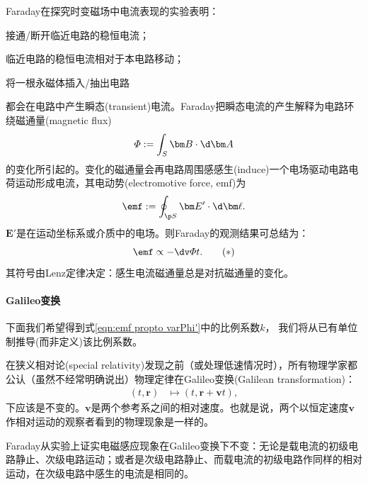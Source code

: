 Faraday在探究时变磁场中电流表现的实验表明：
\begin{compactenum}
    \item 接通/断开临近电路的稳恒电流；
    \item 临近电路的稳恒电流相对于本电路移动；
    \item 将一根永磁体插入/抽出电路
\end{compactenum}
都会在电路中产生瞬态(transient)电流。Faraday把瞬态电流的产生解释为电路环绕磁通量(magnetic flux)%
\begin{equation}
    \varPhi:=\int_S\bm B\cdot\d\bm A
\end{equation}
的变化所引起的。变化的磁通量会再电路周围感感生(induce)一个电场驱动电路电荷运动形成电流，其电动势(electromotive force, emf)为
\begin{equation}
    \emf:=\oint_{\p S}\bm E'\cdot\d\bm \ell.
\end{equation}
$\bm E'$是在运动坐标系或介质中的电场。则Faraday的观测结果可总结为：
\begin{equation}
    \label{eqn:emf propto varPhi'}
    \emf\propto-\dv\varPhi t.
    \tag{$\ast$}
\end{equation}
其符号由Lenz定律决定：感生电流磁通量总是对抗磁通量的变化。

\paragraph{Galileo变换}

下面我们希望得到式\eqref{eqn:emf propto varPhi'}中的比例系数$k$，%
我们将从已有单位制推导(而非定义)该比例系数。

在狭义相对论(special relativity)发现之前（或处理低速情况时），所有物理学家都公认（虽然不经常明确说出）物理定律在Galileo变换(Galilean transformation)：
\begin{align*}
    (t,\bm r)&\mapsto(t,\bm r+\bm vt),
\end{align*}
下应该是不变的。$\bm v$是两个参考系之间的相对速度。也就是说，两个以恒定速度$\bm v$作相对运动的观察者看到的物理现象是一样的。%

Faraday从实验上证实电磁感应现象在Galileo变换下不变：无论是载电流的初级电路静止、次级电路运动；或者是次级电路静止、而载电流的初级电路作同样的相对运动，在次级电路中感生的电流是相同的。

